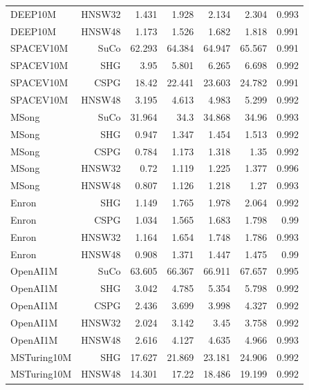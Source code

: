 \begin{table}[t]
\begin{tabular}{lrrrrrr}
DEEP10M & HNSW32 & 1.431 & 1.928 & 2.134 & 2.304 & 0.993 \\
DEEP10M & HNSW48 & 1.173 & 1.526 & 1.682 & 1.818 & 0.991 \\
SPACEV10M & SuCo & 62.293 & 64.384 & 64.947 & 65.567 & 0.991 \\
SPACEV10M & SHG & 3.95 & 5.801 & 6.265 & 6.698 & 0.992 \\
SPACEV10M & CSPG & 18.42 & 22.441 & 23.603 & 24.782 & 0.991 \\
SPACEV10M & HNSW48 & 3.195 & 4.613 & 4.983 & 5.299 & 0.992 \\
MSong & SuCo & 31.964 & 34.3 & 34.868 & 34.96 & 0.993 \\
MSong & SHG & 0.947 & 1.347 & 1.454 & 1.513 & 0.992 \\
MSong & CSPG & 0.784 & 1.173 & 1.318 & 1.35 & 0.992 \\
MSong & HNSW32 & 0.72 & 1.119 & 1.225 & 1.377 & 0.996 \\
MSong & HNSW48 & 0.807 & 1.126 & 1.218 & 1.27 & 0.993 \\
Enron & SHG & 1.149 & 1.765 & 1.978 & 2.064 & 0.992 \\
Enron & CSPG & 1.034 & 1.565 & 1.683 & 1.798 & 0.99 \\
Enron & HNSW32 & 1.164 & 1.654 & 1.748 & 1.786 & 0.993 \\
Enron & HNSW48 & 0.908 & 1.371 & 1.447 & 1.475 & 0.99 \\
OpenAI1M & SuCo & 63.605 & 66.367 & 66.911 & 67.657 & 0.995 \\
OpenAI1M & SHG & 3.042 & 4.785 & 5.354 & 5.798 & 0.992 \\
OpenAI1M & CSPG & 2.436 & 3.699 & 3.998 & 4.327 & 0.992 \\
OpenAI1M & HNSW32 & 2.024 & 3.142 & 3.45 & 3.758 & 0.992 \\
OpenAI1M & HNSW48 & 2.616 & 4.127 & 4.635 & 4.966 & 0.993 \\
MSTuring10M & SHG & 17.627 & 21.869 & 23.181 & 24.906 & 0.992 \\
MSTuring10M & HNSW48 & 14.301 & 17.22 & 18.486 & 19.199 & 0.992 \\
\bottomrule
\end{tabular}
\end{table}
